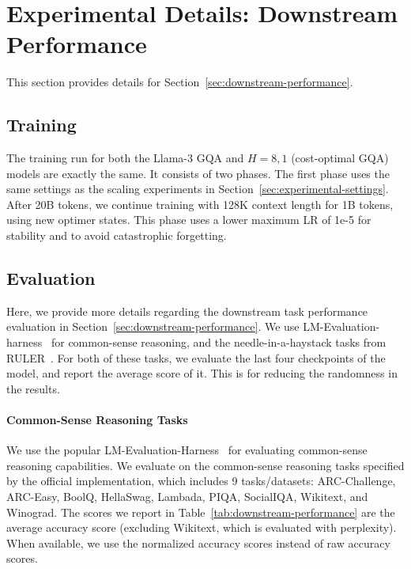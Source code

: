 \section{Experimental Details: Downstream Performance}

This section provides details for Section~\ref{sec:downstream-performance}.

\subsection{Training}
\label{sec:appendix-downtream-training}

The training run for both the Llama-3 GQA and $H=8,1$ (cost-optimal GQA) models are exactly the same. It consists of two phases. The first phase uses the same settings as the scaling experiments in Section~\ref{sec:experimental-settings}. After 20B tokens, we continue training with 128K context length for 1B tokens, using new optimer states. This phase uses a lower maximum LR of 1e-5 for stability and to avoid catastrophic forgetting.


\subsection{Evaluation}
\label{sec:appendix-downstream-eval}

Here, we provide more details regarding the downstream task performance evaluation in Section~\ref{sec:downstream-performance}. We use LM-Evaluation-harness~\citep{eval-harness} for common-sense reasoning, and the needle-in-a-haystack tasks from RULER~\citep{ruler}. For both of these tasks, we evaluate the last four checkpoints of the model, and report the average score of it. This is for reducing the randomness in the results.

\paragraph{Common-Sense Reasoning Tasks} 

We use the popular LM-Evaluation-Harness~\citep{eval-harness} for evaluating common-sense reasoning capabilities. We evaluate on the common-sense reasoning tasks specified by the official implementation, which includes 9 tasks/datasets: ARC-Challenge, ARC-Easy, BoolQ, HellaSwag, Lambada, PIQA, SocialIQA, Wikitext, and Winograd. The scores we report in Table~\ref{tab:downstream-performance} are the average accuracy score (excluding Wikitext, which is evaluated with perplexity). When available, we use the normalized accuracy scores instead of raw accuracy scores.

